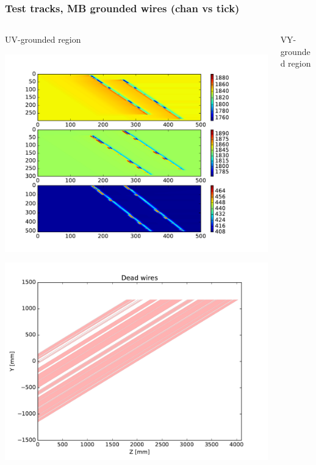 \documentclass[xcolor=dvipsnames]{beamer}
\begin{document}
\begin{frame}
  \frametitle{Test tracks, MB grounded wires (chan vs tick)}

  \vspace{-5mm}

  \begin{columns}
    \begin{column}{0.5\textwidth}
      \begin{center}
        \scriptsize UV-grounded region

        \includegraphics[height=0.6\textheight,clip,trim=15mm 1cm 0 1cm]{ideal-2tracks-uboone-uv-shorted-adc.pdf}

        \includegraphics[height=0.3\textheight,page=1,clip,trim=0 0 0 13.7mm]{microboone-shorted-wires-v2.pdf}
      \end{center}
    \end{column}
    \begin{column}{0.5\textwidth}
      \begin{center}
        \scriptsize VY-grounded region


\end{center}
\end{column}
\end{columns}
\end{frame}
\end{document}
